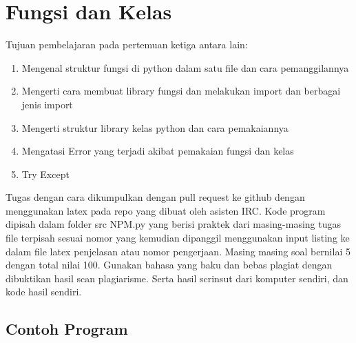 \chapter{Fungsi dan Kelas}
Tujuan pembelajaran pada pertemuan ketiga antara lain:
\begin{enumerate}
\item
Mengenal struktur fungsi di python dalam satu file dan cara pemanggilannya
\item
Mengerti cara membuat library fungsi dan melakukan import dan berbagai jenis import
\item
Mengerti struktur library kelas python dan cara pemakaiannya
\item
Mengatasi Error yang terjadi akibat pemakaian fungsi dan kelas
\item
Try Except
\end{enumerate}
Tugas dengan cara dikumpulkan dengan pull request ke github dengan menggunakan latex pada repo yang dibuat oleh asisten IRC. Kode program dipisah dalam folder src NPM.py yang berisi praktek dari masing-masing tugas file terpisah sesuai nomor yang kemudian dipanggil menggunakan input listing ke dalam file latex penjelasan atau nomor pengerjaan. Masing masing soal bernilai 5 dengan total nilai 100. Gunakan bahasa yang baku dan bebas plagiat dengan dibuktikan hasil scan plagiarisme. Serta hasil scrinsut dari komputer sendiri, dan kode hasil sendiri.

\section{Contoh Program}
